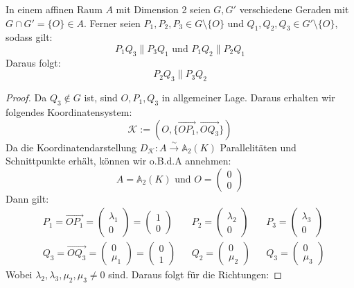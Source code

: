 \documentclass[parskip,a4paper,twoside,DIV15,BCOR12mm]{scrbook}
\begin{document}
\begin{theo}
In einem affinen Raum $A$ mit Dimension 2 seien $G,G'$ verschiedene Geraden
mit $G\cap G'=\{O\}\in A$. Ferner seien $P_1,P_2,P_3\in G\setminus\{O\}$
und $Q_1,Q_2,Q_3\in G'\setminus\{O\}$, sodass gilt:
\[ P_1Q_3\parallel P_3Q_1\text{ und }P_1Q_2\parallel P_2Q_1\]
Daraus folgt:
\[ P_2Q_3\parallel P_3Q_2\]
\end{theo}

\begin{proof}
Da $Q_3\notin G$ ist, sind $O,P_1,Q_3$ in allgemeiner Lage. Daraus erhalten
wir folgendes Koordinatensystem: 
\[\mathcal{K}:=(O,\{\overrightarrow{OP_1},\overrightarrow{OQ_3}\})\]
Da die Koordinatendarstellung $D_{\mathcal{K}}:A\stackrel{\sim}{\to}\mathbb{A}_2(K)$ 
Parallelitäten und Schnittpunkte erhält, können wir o.B.d.A annehmen:
\[A=\mathbb{A}_2(K) \text{ und }O=\begin{pmatrix}0\\0\end{pmatrix}\]
Dann gilt:
\begin{align*}
&P_1=\overrightarrow{OP_1}=\begin{pmatrix}\lambda_1\\0\end{pmatrix}=\begin{pmatrix}1\\0\end{pmatrix}
& &P_2=\begin{pmatrix}\lambda_2\\0\end{pmatrix}
& &P_3=\begin{pmatrix}\lambda_3\\0\end{pmatrix}\\
&Q_3=\overrightarrow{OQ_3}=\begin{pmatrix}0\\\mu_1\end{pmatrix}=\begin{pmatrix}0\\1\end{pmatrix}
& &Q_2=\begin{pmatrix}0\\\mu_2\end{pmatrix}
& &Q_3=\begin{pmatrix}0\\\mu_3\end{pmatrix}
\end{align*}
Wobei $\lambda_2,\lambda_3,\mu_2,\mu_3\ne 0$ sind. Daraus folgt für die Richtungen:

\end{proof}
\end{document}
